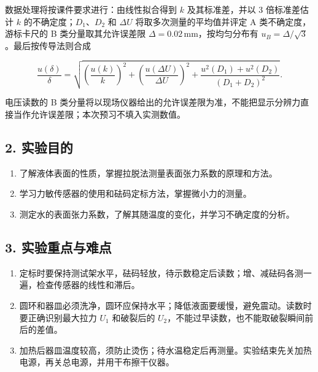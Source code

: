 数据处理将按课件要求进行：由线性拟合得到 $k$ 及其标准差，并以 3 倍标准差估计 $k$ 的不确定度；$D_1$、$D_2$ 和 $\Delta U$ 将取多次测量的平均值并评定 A 类不确定度，游标卡尺的 B 类分量取其允许误差限 $\Delta=0.02\,\mathrm{mm}$，按均匀分布有 $u_B=\Delta/\sqrt3$。最后按传导法则合成

\[
\frac{u(\delta)}{\delta}=\sqrt{\left(\frac{u(k)}{k}\right)^{2}+\left(\frac{u(\Delta U)}{\Delta U}\right)^{2}+\frac{u^{2}(D_1)+u^{2}(D_2)}{(D_1+D_2)^{2}}}.
\]

电压读数的 B 类分量将以现场仪器给出的允许误差限为准，不能把显示分辨力直接当作允许误差限；本次预习不填入实测数值。

\subsection*{2. 实验目的}

\begin{enumerate}
\item 了解液体表面的性质，掌握拉脱法测量表面张力系数的原理和方法。
\item 学习力敏传感器的使用和砝码定标方法，掌握微小力的测量。
\item 测定水的表面张力系数，了解其随温度的变化，并学习不确定度的分析。
\end{enumerate}

\subsection*{3. 实验重点与难点}

\begin{enumerate}
\item 定标时要保持测试架水平，砝码轻放，待示数稳定后读数；增、减砝码各测一遍，检查传感器的线性和滞后。
\item 圆环和器皿必须洗净，圆环应保持水平；降低液面要缓慢，避免震动。读数时要正确识别最大拉力 $U_1$ 和破裂后的 $U_2$，不能过早读数，也不能取破裂瞬间前后的差值。
\item 加热后器皿温度较高，须防止烫伤；待水温稳定后再测量。实验结束先关加热电源，再关总电源，并用干布擦干仪器。
\end{enumerate}
